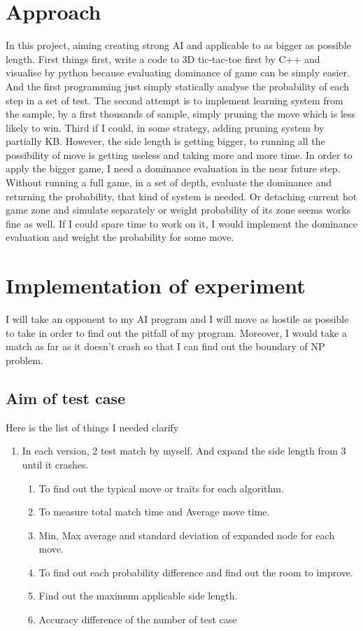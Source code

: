\documentclass[11pt]{article}
\begin{document}
\section{Approach}
In this project, aiming creating strong AI and applicable to as bigger as possible length. First things first, write a code to 3D tic-tac-toe first by C++ and visualise by python because evaluating dominance of game can be simply easier. And the first programming just simply statically analyse the probability of each step in a set of test\cite{abramson1990expected}. The second attempt is to implement learning system from the sample, by a first thousands of sample, simply pruning the move which is less likely to win\cite{brugmann1993monte}. Third if I could, in some strategy, adding pruning system by partially KB. However, the side length is getting bigger, to running all the possibility of move is getting useless and taking more and more time\cite{bouzy2004monte}. In order to apply the bigger game, I need a dominance evaluation in the near future step. Without running a full game, in a set of depth, evaluate the dominance and returning the probability, that kind of system is needed. Or detaching current hot game zone and simulate separately or weight probability of its zone seems works fine as well. If I could spare time to work on it, I would implement the dominance evaluation and weight the probability for some move. 

\section{Implementation of experiment} 
I will take an opponent to my AI program and I will move as hostile as possible to take in order to find out the pitfall of my program. Moreover, I would take a match as far as it doesn't crash so that I can find out the boundary of NP problem.
\subsection{Aim of test case}
Here is the list of things I needed clarify
\begin{enumerate}
\item In each version, 2 test match by myself. And expand the side length from 3 until it crashes.
\begin{enumerate}
\item To find out the typical move or traits for each algorithm.
\item To measure total match time and Average move time.
\item Min, Max average and standard deviation of expanded node for each move.
\item To find out each probability difference and find out the room to improve.
\item Find out the maximum applicable side length. 
\item Accuracy difference of the number of test case
\end{enumerate}

\end{enumerate}
\end{document}
